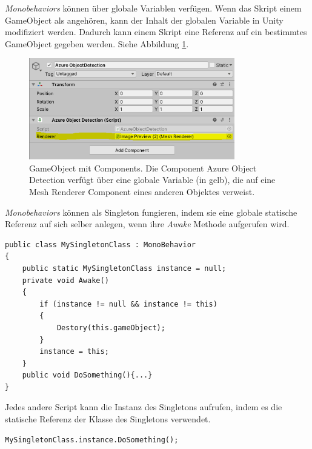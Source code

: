 \textit{Monobehaviors} können über globale Variablen verfügen. Wenn das Skript einem GameObject als angehören, kann der Inhalt der globalen Variable in Unity modifiziert werden. Dadurch kann einem Skript eine Referenz auf ein bestimmtes GameObject gegeben werden. Siehe Abbildung \ref{img:gloabvars}.

\begin{figure}[H]
	\centering
	\includegraphics[width=0.8\textwidth]{images/img_globalVars.png}
	\caption[Unity GameObject mit Components]{GameObject mit Components. Die Component Azure Object Detection verfügt über eine globale Variable (in gelb), die auf eine Mesh Renderer Component eines anderen Objektes verweist.}
	\label{img:gloabvars}
\end{figure}


\textit{Monobehaviors} können als Singleton fungieren, indem sie eine globale statische Referenz auf sich selber anlegen, wenn ihre \textit{Awake} Methode aufgerufen wird.%

\begin{lstlisting}
public class MySingletonClass : MonoBehavior
{
	public static MySingletonClass instance = null;
	private void Awake()
	{
		if (instance != null && instance != this)
		{
			Destory(this.gameObject);
		}
		instance = this;
	}
	public void DoSomething(){...}
}
\end{lstlisting}


Jedes andere Script kann die Instanz des Singletons aufrufen, indem es die statische Referenz der Klasse des Singletons verwendet. %
\begin{lstlisting}
MySingletonClass.instance.DoSomething();
\end{lstlisting}

